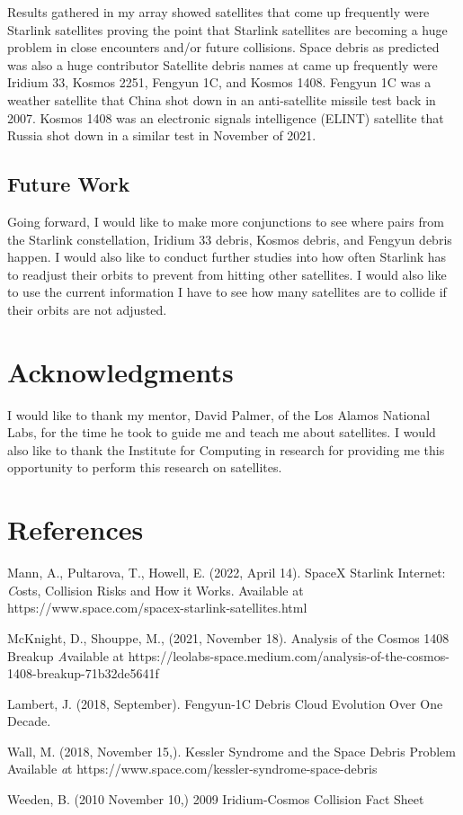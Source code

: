 \documentclass[11pt, a4paper, twocolumn]{article}
\begin{document}
	Results gathered in my array showed satellites that come up frequently were Starlink satellites proving the point that Starlink satellites are becoming a huge problem in close encounters and/or future collisions. Space debris as predicted was also a huge contributor Satellite debris names at came up frequently were Iridium 33, Kosmos 2251, Fengyun 1C, and Kosmos 1408. Fengyun 1C was a weather satellite that China shot down in an anti-satellite missile test back in 2007. Kosmos 1408 was an electronic signals intelligence (ELINT) satellite that Russia shot down in a similar test in November of 2021.  

\subsection{Future Work}
\label{Future Work}
Going forward, I would like to make more conjunctions to see where pairs from the Starlink constellation, Iridium 33 debris, Kosmos debris, and Fengyun debris happen. I would also like to conduct further studies into how often Starlink has to readjust their orbits to prevent from hitting other satellites. I would also like to use the current information I have to see how many satellites are to collide if their orbits are not adjusted.

\section{Acknowledgments}
	I would like to thank my mentor, David Palmer, of the Los Alamos National Labs, for the time he took to guide me and teach me about satellites. I would also like to thank the Institute for Computing in research for providing me this opportunity to perform this research on satellites.
\section{References}
\begin{hangparas}{.25in}{1}

Mann, A., Pultarova, T.,  Howell, E. (2022, April 14). SpaceX Starlink Internet: \emph Costs, Collision Risks and How it Works. Available at https://www.space.com/spacex-starlink-satellites.html


McKnight, D., Shouppe, M., (2021, November 18). Analysis of the Cosmos 1408 Breakup \emph Available at https://leolabs-space.medium.com/analysis-of-the-cosmos-1408-breakup-71b32de5641f

Lambert, J. (2018, September). Fengyun-1C Debris Cloud Evolution Over One Decade. %

Wall, M. (2018, November 15,). Kessler Syndrome and the Space Debris Problem Available \emph at https://www.space.com/kessler-syndrome-space-debris

Weeden, B. (2010 November 10,) 2009 Iridium-Cosmos Collision Fact Sheet 
\end{hangparas}
\end{document}
